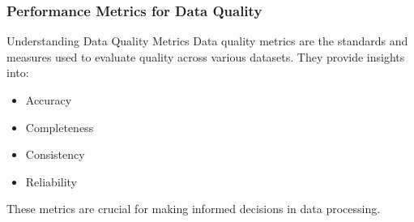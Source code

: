 \documentclass[aspectratio=169]{beamer}
\begin{document}
\begin{frame}[fragile]
    \frametitle{Performance Metrics for Data Quality}
    \begin{block}{Understanding Data Quality Metrics}
        Data quality metrics are the standards and measures used to evaluate quality across various datasets. They provide insights into:
        \begin{itemize}
            \item Accuracy
            \item Completeness
            \item Consistency
            \item Reliability
        \end{itemize}
        These metrics are crucial for making informed decisions in data processing.
    \end{block}
\end{frame}
\end{document}
